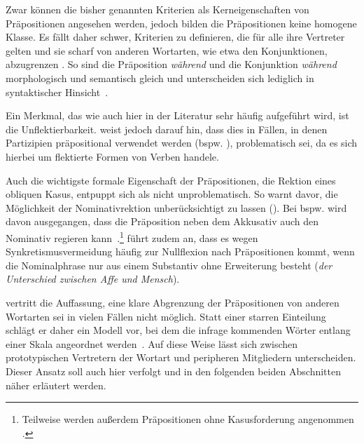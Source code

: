 Zwar können die bisher genannten Kriterien als Kerneigenschaften von Präpositionen angesehen werden, jedoch bilden die Präpositionen keine homogene Klasse.
Es fällt daher schwer, Kriterien zu definieren, die für alle ihre Vertreter gelten und sie scharf von anderen Wortarten, wie etwa den Konjunktionen, abzugrenzen \citep[s.][264]{Lindqvist1994}. 
So sind die Pr{\"a}position \textit{w{\"a}hrend }und die Konjunktion \textit{w{\"a}hrend }morphologisch und semantisch gleich und unterscheiden sich lediglich in syntaktischer Hinsicht~\citep[s.][39]{Romare.2004}.

Ein Merkmal, das wie auch hier in der Literatur sehr h{\"a}ufig aufgef{\"u}hrt wird, ist die Unflektierbarkeit. 
\citet[10--11]{Lindqvist1994} weist jedoch darauf hin, dass dies in F{\"a}llen, in denen Partizipien pr{\"a}positional verwendet werden (bspw. ), problematisch sei, da es sich hierbei um flektierte Formen von Verben handele. 

Auch die wichtigste formale Eigenschaft der Präpositionen, die Rektion eines obliquen Kasus, entpuppt sich als nicht unproblematisch. 
So warnt \citet[29]{Lindqvist1994} davor, die M{\"o}glichkeit der Nominativrektion unber{\"u}cksichtigt zu lassen (\cites[s. auch][134]{Eroms1981}[695]{Engel1988}). 
Bei  bspw. wird davon ausgegangen, dass die Pr{\"a}position neben dem Akkusativ auch den Nominativ regieren kann~\citep[s.][291]{Hentschel1989}.\footnote{Teilweise werden außerdem Präpositionen ohne Kasusforderung angenommen \citep[so etwa bei][73]{Wunderlich1984}.}
\citet[291]{Hentschel1989} f{\"u}hrt zudem an, dass es wegen Synkretismusvermeidung h{\"a}ufig zur Nullflexion nach Pr{\"a}positionen kommt, wenn die Nominalphrase nur aus einem Substantiv ohne Erweiterung besteht (\textit{der Unterschied zwischen Affe und Mensch}). 

\citet{Lindqvist1994} vertritt die Auffassung, eine klare Abgrenzung der Pr{\"a}positionen von anderen Wortarten sei in vielen F{\"a}llen nicht m{\"o}glich.
Statt einer starren Einteilung schl{\"a}gt er daher ein Modell vor, bei dem die infrage kommenden W{\"o}rter entlang einer Skala angeordnet werden~\citep[s.][5]{Lindqvist1994}. 
Auf diese Weise lässt sich zwischen prototypischen Vertretern der Wortart und peripheren Mitgliedern unterscheiden. 
Dieser Ansatz soll auch hier verfolgt und in den folgenden beiden Abschnitten näher erläutert werden. 
